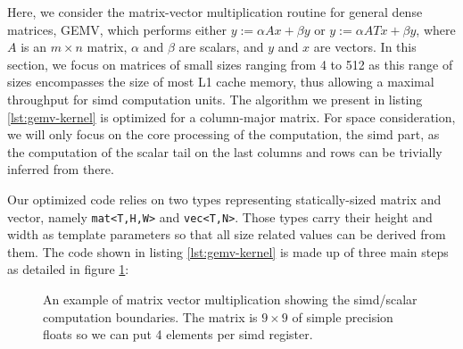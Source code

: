 \documentclass[../main]{subfiles}
\begin{document}
Here, we consider the matrix-vector multiplication routine
for general dense matrices, GEMV, which performs either
$y := \alpha A x + \beta y$ or $y := \alpha A T x + \beta y$,
where $A$ is an $m \times n$ matrix, $\alpha$ and $\beta$ are scalars,
and $y$ and $x$ are vectors. In this section,
we focus on matrices of small sizes ranging from
4 to 512 as this range of sizes encompasses the size of
most L1 cache memory, thus allowing a maximal throughput
for \gls{simd} computation units. The algorithm we present in
listing \ref{lst:gemv-kernel} is optimized for a column-major matrix.
For space consideration, we will only focus on the core processing of
the computation, \ie the \gls{simd} part, as the computation of
the scalar tail on the last columns and rows can be trivially
inferred from there.

Our optimized code relies on two types representing
statically-sized matrix and vector, namely \lstinline{mat<T,H,W>}
and \lstinline{vec<T,N>}. Those types carry their height and width
as template parameters so that all size related values can be
derived from them. The code shown in listing \ref{lst:gemv-kernel} is made up
of three main steps as detailed in figure \ref{fig:simd-gemv-illustration}:

\begin{figure}[h]
\fontsize{8}{10}\selectfont

\caption{
  An example of matrix vector multiplication showing the \gls{simd}/scalar
  computation boundaries. The matrix is $9 \times 9$ of simple precision floats
  so we can put 4 elements per \gls{simd} register.
}
\label{fig:simd-gemv-illustration}
\end{figure}
\end{document}

